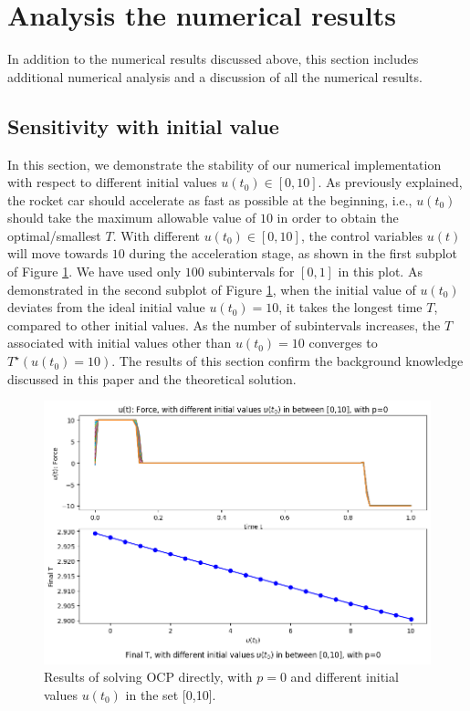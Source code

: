 \documentclass  [
  paper    = a4,
  BCOR     = 10mm,
  twoside,
  fontsize = 12pt,
  fleqn,
  toc      = bibnumbered,
  toc      = listofnumbered,
  numbers  = noendperiod,
  headings = normal,
  listof   = leveldown,
  version  = 3.03
]                                       {scrreprt}
\newcommand{\<}{\langle}
\renewcommand{\>}{\rangle}
\begin{document}
\section{Analysis the numerical results}
\label{Sec_NR}

In addition to the numerical results discussed above, this section includes additional numerical analysis and a discussion of all the numerical results.

\subsection{Sensitivity with initial value}

In this section, we demonstrate the stability of our numerical implementation with respect to different initial values $u(t_0) \in [0,10]$. As previously explained, the rocket car should accelerate as fast as possible at the beginning, i.e., $u(t_0)$ should take the maximum allowable value of $10$ in order to obtain the optimal/smallest $T$. With different $u(t_0) \in [0,10]$, the control variables $u(t)$ will move towards $10$ during the acceleration stage, as shown in the first subplot of Figure \ref{fig1_initialUt}. We have used only $100$ subintervals for $[0,1]$ in this plot. As demonstrated in the second subplot of Figure \ref{fig1_initialUt}, when the initial value of $u(t_0)$ deviates from the ideal initial value $u(t_0)=10$, it takes the longest time $T$, compared to other initial values. As the number of subintervals increases, the $T$ associated with initial values other than $u(t_0)=10$ converges to $T^\star(u(t_0)=10)$. The results of this section confirm the background knowledge discussed in this paper and the theoretical solution.



 \begin{figure}[h]
	\centerline{\includegraphics[width=12cm]{initial_value.png}}
	\caption{Results of solving OCP directly, with $p=0$ and different initial values $u(t_0)$ in the set [0,10]. }
	\label{fig1_initialUt}
\end{figure}\textbf{}
\end{document}
